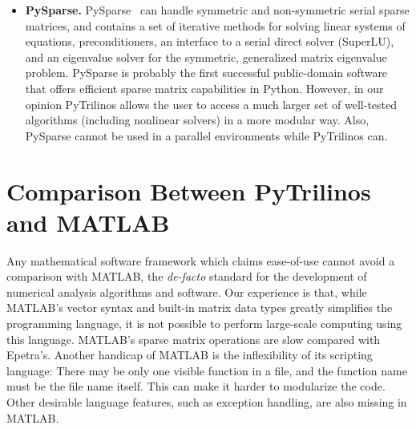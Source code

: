 \documentclass[acmtocl]{acmtrans2m}
\begin{document}
\begin{itemize}
\item {\bf PySparse.}  PySparse~\cite{broker05using} can handle
  symmetric and non-symmetric serial sparse matrices, and contains a
  set of iterative methods for solving linear systems of equations,
  preconditioners, an interface to a serial direct solver (SuperLU),
  and an eigenvalue solver for the symmetric, generalized matrix
  eigenvalue problem.  PySparse is probably the first successful
  public-domain software that offers efficient sparse matrix
  capabilities in Python. However, in our opinion PyTrilinos allows
  the user to access a much larger set of well-tested algorithms
  (including nonlinear solvers) in a more modular way.  Also,
  PySparse cannot be used in a parallel environments while PyTrilinos
  can.

\end{itemize}

\section{Comparison Between PyTrilinos and MATLAB}
\label{sec:comparison_matlab}

Any mathematical software framework which claims ease-of-use cannot
avoid a comparison with MATLAB, the {\sl de-facto} standard for the
development of numerical analysis algorithms and software.  Our
experience is that, while MATLAB's vector syntax and built-in matrix
data types greatly simplifies the programming language, it is not
possible to perform large-scale computing using this language.
MATLAB's sparse matrix operations are slow compared with Epetra's.
Another handicap of MATLAB is the inflexibility of its scripting
language: There may be only one visible function in a file, and the
function name must be the file name itself. This can make it harder to
modularize the code. Other desirable language features, such as
exception handling, are also missing in MATLAB.
\end{document}

